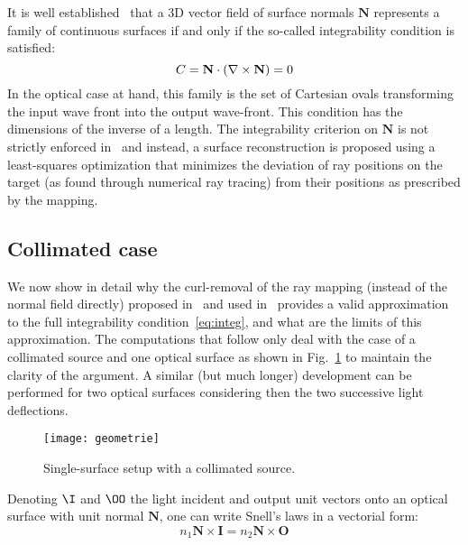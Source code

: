 It is well established~\cite{Fournier2010,Ries2002} that a 3D vector
field of surface normals $\mathbf{N}$ represents a family of
continuous surfaces if and only if the so-called integrability
condition is satisfied:
\begin{equation}
  C = \mathbf{N} \cdot (\nabla \times \mathbf{N}) = 0
  \label{eq:integ}
\end{equation}
In the optical case at hand, this family is the set of Cartesian ovals
transforming the input wave front into the output wave-front.
This condition has the dimensions of the inverse of a length. The
integrability criterion on $\mathbf{N}$ is not strictly enforced
in~\cite{Baeuerle2012} and instead, a surface reconstruction is
proposed using a least-squares optimization that minimizes the
deviation of ray positions on the target (as found through numerical
ray tracing) from their positions as prescribed by the mapping.


\subsection{Collimated case}

We now show in detail why the curl-removal of the ray mapping (instead
of the normal field directly) proposed in~\cite{Baeuerle2012} and used
in~\cite{Bruneton2012} provides
a valid approximation to the full integrability
condition~\eqref{eq:integ}, and what are the limits of this
approximation.  The computations that follow only deal with the case
of a collimated source and one optical surface as shown in
Fig.~\ref{fig:1surf-setup} to maintain the clarity of the argument. 
A similar (but much longer) development can be performed for two optical
surfaces considering then the two successive light deflections.

\begin{figure}[!htbp]
  \centering 
  \texttt{[image: geometrie]}
  \caption{Single-surface setup with a collimated source.}
  \label{fig:1surf-setup}
\end{figure}

Denoting $\I$ and $\OO$ the light incident and output unit vectors onto 
an optical surface with unit normal $\mathbf{N}$, one can write 
Snell's laws in a vectorial form\cite{Benitez2004b}:
\begin{equation}
  n_1 \mathbf{N} \times \mathbf{I} = n_2 \mathbf{N} \times \mathbf{O} 
  \label{eq:snell}
\end{equation}

